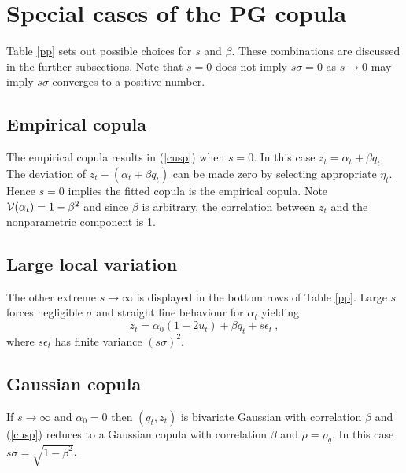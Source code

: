 \documentclass[authoryear]{elsarticle}
\newcommand{\E}{\mathrm{E}}
\newcommand{\cov}{\mathrm{cov}}
\newcommand{\eps}{\epsilon}
\newcommand{\cor}{\mathrm{cor}}
\newcommand{\eref}[1]{(\ref{#1})}
\newcommand{\tref}[1]{Table \ref{#1}}
\newcommand{\cq}{\ , \qquad}
\newcommand{\Vx}{{\cal V}}
\begin{document}

\section{Special cases of the PG copula}

\tref{pp} sets out possible choices for $s$ and $\beta$.   These combinations are discussed in the further subsections.  Note that $s=0$ does not imply $s\sigma=0$ as $s\rightarrow 0$ may imply $s\sigma$ converges to a positive number.



\subsection{Empirical copula}

The empirical copula results in \eref{cusp} when $s=0$.  In this case   $z_t=\alpha_t+\beta q_t$.    The deviation of $z_t-(\alpha_t+\beta q_t)$ can be made zero by selecting appropriate $\eta_t$.  Hence $s=0$ implies the fitted copula is the empirical copula.  Note $\Vx(\alpha_t)=1-\beta^2$ and since $\beta$ is arbitrary, the correlation between $z_t$ and the nonparametric component is 1.

\subsection{Large local variation}

The other  extreme  $s\rightarrow\infty$ is displayed  in the bottom rows of \tref{pp}.  Large $s$ forces negligible $\sigma$  and straight line behaviour for $\alpha_t$ yielding
$$
z_t= \alpha_0(1-2u_t) + \beta q_t + s\eps_t\ ,
$$
where $s\eps_t$ has finite variance $(s\sigma)^2$.     

\subsection{Gaussian copula}
If $s\rightarrow\infty$ and  $\alpha_0=0$ then $(q_t,z_t)$ is bivariate   Gaussian with correlation $\beta$ and \eref{cusp} reduces to a Gaussian copula with correlation $\beta$ and $\rho=\rho_q$.  In this case $s\sigma=\sqrt{1-\beta^2}$. 
\end{document}
